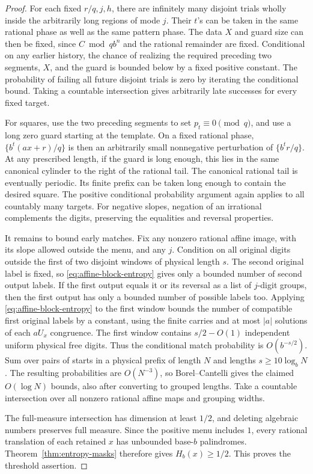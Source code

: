 \begin{proof}
For each fixed \(r/q,j,h\), there are infinitely many disjoint trials wholly inside the arbitrarily long regions of mode \(j\). Their \(t\)'s can be taken in the same rational phase as well as the same pattern phase. The data \(X\) and guard size can then be fixed, since \(C\bmod qb^n\) and the rational remainder are fixed. Conditional on any earlier history, the chance of realizing the required preceding two segments, \(X\), and the guard is bounded below by a fixed positive constant. The probability of failing all future disjoint trials is zero by iterating the conditional bound. Taking a countable intersection gives arbitrarily late successes for every fixed target.

For squares, use the two preceding segments to set \(p_t\equiv0\pmod q\), and use a long zero guard starting at the template. On a fixed rational phase, \(\{b^t(ax+r)/q\}\) is then an arbitrarily small nonnegative perturbation of \(\{b^t r/q\}\). At any prescribed length, if the guard is long enough, this lies in the same canonical cylinder to the right of the rational tail. The canonical rational tail is eventually periodic. Its finite prefix can be taken long enough to contain the desired square. The positive conditional probability argument again applies to all countably many targets. For negative slopes, negation of an irrational complements the digits, preserving the equalities and reversal properties.

It remains to bound early matches. Fix any nonzero rational affine image, with its slope allowed outside the menu, and any \(j\). Condition on all original digits outside the first of two disjoint windows of physical length \(s\). The second original label is fixed, so \eqref{eq:affine-block-entropy} gives only a bounded number of second output labels. If the first output equals it or its reversal as a list of \(j\)-digit groups, then the first output has only a bounded number of possible labels too. Applying \eqref{eq:affine-block-entropy} to the first window bounds the number of compatible first original labels by a constant, using the finite carries and at most \(|a|\) solutions of each \(aU_x\) congruence. The first window contains \(s/2-O(1)\) independent uniform physical free digits. Thus the conditional match probability is \(O(b^{-s/2})\). Sum over pairs of starts in a physical prefix of length \(N\) and lengths \(s\ge10\log_b N\). The resulting probabilities are \(O(N^{-3})\), so Borel--Cantelli gives the claimed \(O(\log N)\) bounds, also after converting to grouped lengths. Take a countable intersection over all nonzero rational affine maps and grouping widths.

The full-measure intersection has dimension at least \(1/2\), and deleting algebraic numbers preserves full measure. Since the positive menu includes \(1\), every rational translation of each retained \(x\) has unbounded base-\(b\) palindromes. Theorem~\ref{thm:entropy-masks} therefore gives \(H_b(x)\ge1/2\). This proves the threshold assertion.
\end{proof}

